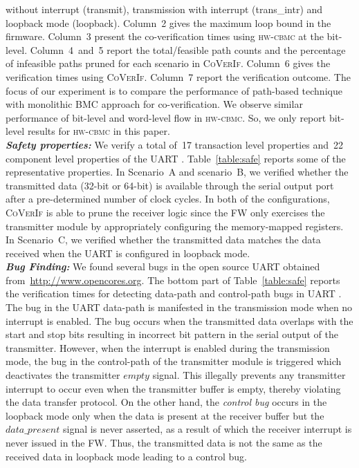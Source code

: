 \documentclass[sigconf]{acmart}
\newcommand{\sjcmt}[1]{{\color{blue} [{#1}]}}
\newcommand{\tool}[1]{\textsc{#1}\xspace}
\newcommand{\hwcbmcv}{\tool{hw-cbmc}}
\newcommand{\verifox}{\tool{CoVerIf}}
\begin{document}
without interrupt (transmit), transmission with interrupt (trans\_intr) and
loopback mode (loopback).  Column~2 gives the maximum loop bound in the
firmware.  Column~3 present the co-verification times using \hwcbmcv
at the bit-level.  Column~4~and~5 report the total/feasible path counts and the 
percentage of infeasible paths pruned for each scenario in \verifox.  
Column~6 gives the verification times using \verifox.  Column~7 report 
the verification outcome. The focus of our experiment is to compare 
the performance of path-based technique with monolithic BMC approach for 
co-verification.  We observe similar performance of bit-level and word-level 
flow in \hwcbmcv. So, we only report bit-level results for \hwcbmcv in this
paper. \\ 
\textbf{\emph{Safety properties:}}
We verify a total of~17 transaction level properties and~22 component level 
properties of the UART .  Table~\ref{table:safe} reports some of the
representative properties.  In Scenario~A and scenario~B, we verified whether
the transmitted data (32-bit or 64-bit) is available through the serial
output port after a pre-determined number of clock cycles.
In both of the configurations, \verifox is able to prune the receiver logic since the
FW only exercises the transmitter module by appropriately configuring
the memory-mapped registers.  In Scenario~C, we verified whether the transmitted
data matches the data received when the UART is configured in loopback
mode.\\ 
\textbf{\emph{Bug Finding:}}
We found several bugs in the open source UART  obtained from~\url{http://www.opencores.org}.  
The bottom part of Table~\ref{table:safe} reports the verification
times for detecting data-path and control-path bugs in UART .  
The bug in the UART data-path is manifested in the transmission mode when no
interrupt is enabled.  The bug occurs when the transmitted data overlaps
with the start and stop bits resulting in incorrect bit pattern in the
serial output of the transmitter.  However, when the interrupt is enabled
during the transmission mode, the bug in the control-path of the transmitter
module is triggered which deactivates the transmitter $empty$ signal.  This
illegally prevents any transmitter interrupt to occur even when the
transmitter buffer is empty, thereby violating the data transfer protocol. 
On the other hand, the \emph{control bug} occurs in the loopback mode only when the
data is present at the receiver buffer but the $data\_present$ signal is
never asserted, as a result of which the receiver interrupt is never issued
in the FW. Thus, the transmitted data is not the same as the received
data in loopback mode leading to a control bug.
\end{document}
